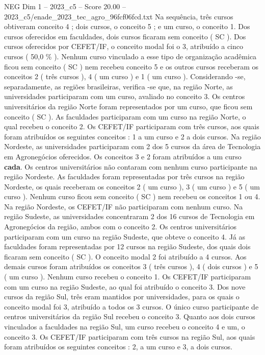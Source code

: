 \begin{textsample}{NEG Dim 1 – 2023\_c5 – Score 20.00 – 2023\_c5/enade\_2023\_tec\_agro\_96fcf06fcd.txt}
Na sequência, três cursos obtiveram conceito 4 ; dois cursos, o conceito 5 ; e um curso, o conceito 1.
Dos cursos oferecidos em faculdades, dois cursos ficaram sem conceito ( SC ).
Dos cursos oferecidos por CEFET/IF, o conceito modal foi o 3, atribuído a cinco cursos ( 50,0 \% ).
Nenhum curso vinculado a esse tipo de organização acadêmica ficou sem conceito ( SC ) nem recebeu conceito 5 e os outros cursos receberam os conceitos 2 ( três cursos ), 4 ( um curso ) e 1 ( um curso ).
Considerando -se, separadamente, as regiões brasileiras, verifica -se que, na região Norte, as universidades participaram com um curso, avaliado no conceito 3.
Os centros universitários da região Norte foram representados por um curso, que ficou sem conceito ( SC ).
As faculdades participaram com um curso na região Norte, o qual recebeu o conceito 2.
Os CEFET/IF participaram com três cursos, aos quais foram atribuídos os seguintes conceitos : 1 a um curso e 2 a dois cursos.
Na região Nordeste, as universidades participaram com 2 dos 5 cursos da área de Tecnologia em Agronegócios oferecidos.
Os conceitos 3 e 2 foram atribuídos a um curso \textbf{cada}.
Os centros universitários não contaram com nenhum curso participante na região Nordeste.
As faculdades foram representadas por três cursos na região Nordeste, os quais receberam os conceitos 2 ( um curso ), 3 ( um curso ) e 5 ( um curso ).
Nenhum curso ficou sem conceito ( SC ) nem recebeu os conceitos 1 ou 4.
Na região Nordeste, os CEFET/IF não participaram com nenhum curso.
Na região Sudeste, as universidades concentraram 2 dos 16 cursos de Tecnologia em Agronegócios da região, ambos com o conceito 2.
Os centros universitários participaram com um curso na região Sudeste, que obteve o conceito 4.
Já as faculdades foram representadas por 12 cursos na região Sudeste, dos quais dois ficaram sem conceito ( SC ).
O conceito modal 2 foi atribuído a 4 cursos.
Aos demais cursos foram atribuídos os conceitos 3 ( três cursos ), 4 ( dois cursos ) e 5 ( um curso ).
Nenhum curso recebeu o conceito 1.
Os CEFET/IF participaram com um curso na região Sudeste, ao qual foi atribuído o conceito 3.
Dos nove cursos da região Sul, três eram mantidos por universidades, para os quais o conceito modal foi 3, atribuído a todos os 3 cursos.
O único curso participante de centros universitários da região Sul recebeu o conceito 3.
Quanto aos dois cursos vinculados a faculdades na região Sul, um curso recebeu o conceito 4 e um, o conceito 3.
Os CEFET/IF participaram com três cursos na região Sul, aos quais foram atribuídos os seguintes conceitos : 2, a um curso e 3, a dois cursos.

\end{textsample}
